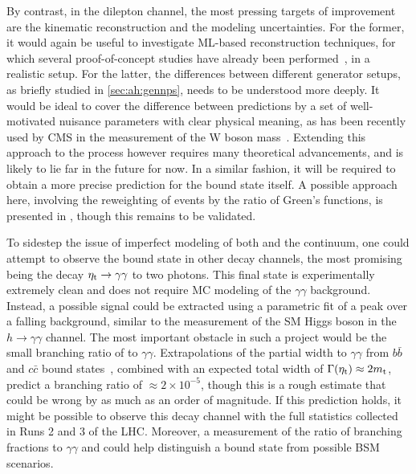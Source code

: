 By contrast, in the dilepton channel, the most pressing targets of improvement are the kinematic reconstruction and the \ttbar modeling uncertainties. For the former, it would again be useful to investigate ML-based reconstruction techniques, for which several proof-of-concept studies have already been performed~\cite{Rubenach:PhD,Raine:2023fko}, in a realistic setup. For the latter, the differences between different generator setups, as briefly studied in \cref{sec:ah:gennps}, needs to be understood more deeply. It would be ideal to cover the difference between predictions by a set of well-motivated nuisance parameters with clear physical meaning, as has been recently used by CMS in the measurement of the W boson mass~\cite{CMS:SMP-23-002,Tackmann:2024kci}. Extending this approach to the \ttbar process however requires many theoretical advancements, and is likely to lie far in the future for now. In a similar fashion, it will be required to obtain a more precise prediction for the \ttbar bound state itself. A possible approach here, involving the reweighting of \ttbar events by the ratio of Green's functions, is presented in , though this remains to be validated.

To sidestep the issue of imperfect modeling of both \etat and the \ttbar continuum, one could attempt to observe the \ttbar bound state in other decay channels, the most promising being the decay $\mathrm{\eta_t} \rightarrow \gamma\gamma$ to two photons. This final state is experimentally extremely clean and does not require MC modeling of the $\gamma\gamma$ background. Instead, a possible signal could be extracted using a parametric fit of a peak over a falling background, similar to the measurement of the SM Higgs boson in the $h \rightarrow \gamma\gamma$ channel. The most important obstacle in such a project would be the small branching ratio of \etat to $\gamma\gamma$. Extrapolations of the partial width to $\gamma\gamma$ from $b\bar{b}$ and $c\bar{c}$ bound states~\cite{Jiang:2024fyw}, combined with an expected total width of $\Gamma(\mathrm{\eta_t}) \approx 2 m_{\mathrm{t}}$, predict a branching ratio of $\approx 2 \times 10^{-5}$, though this is a rough estimate that could be wrong by as much as an order of magnitude. If this prediction holds, it might be possible to observe this decay channel with the full statistics collected in Runs 2 and 3 of the LHC. Moreover, a measurement of the ratio of branching fractions to $\gamma\gamma$ and \ttbar could help distinguish a bound state from possible BSM scenarios.


